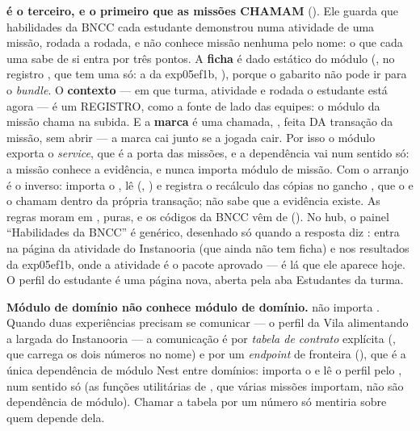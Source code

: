 \begin{regra}
\textbf{ é o terceiro, e o primeiro que as missões CHAMAM}
(). Ele guarda que habilidades da BNCC cada estudante demonstrou
numa atividade de uma missão, rodada a rodada, e não conhece missão nenhuma pelo
nome: o que cada uma sabe de si entra por três pontos. A \textbf{ficha} é dado
estático do módulo (, no registro
, que tem uma só: a da exp05ef1b, ), porque o gabarito
não pode ir para o \emph{bundle}. O \textbf{contexto} --- em que turma, atividade e rodada o
estudante está agora --- é um REGISTRO, como a fonte de lado das equipes: o módulo
da missão chama  na
subida. E a \textbf{marca} é uma chamada, , feita DA transação da missão, sem abrir  --- a marca cai
junto se a jogada cair. Por isso o módulo exporta o \emph{service}, que é a
porta das missões, e a dependência vai num sentido só: a missão conhece a
evidência, e  nunca importa módulo de missão. Com  o arranjo é o inverso:  importa
o , lê  (,
) e registra o recálculo das cópias no gancho
, que o  e o  chamam
dentro da própria transação;  não sabe que a evidência existe. As
regras moram em , puras, e os códigos da BNCC vêm de
 (). No hub, o painel
\enquote{Habilidades da BNCC} é genérico, desenhado só quando a resposta diz
: entra na página da atividade do Instanooria (que ainda não
tem ficha) e nos resultados da exp05ef1b, onde a atividade é o pacote aprovado
--- é lá que ele aparece hoje. O perfil do estudante é uma página nova, aberta
pela aba Estudantes da turma.

\textbf{Módulo de domínio não conhece módulo de domínio.}  não importa
. Quando duas experiências precisam se comunicar --- o perfil da
Vila alimentando a largada do Instanooria --- a comunicação é por \emph{tabela de
contrato} explícita (, que carrega os
dois números no nome) e por um \emph{endpoint} de fronteira
(), que é a única dependência de
módulo Nest entre domínios:  importa o  e lê o perfil
pelo , num sentido só (as funções utilitárias de
, que várias missões importam, não são dependência de módulo). Chamar a tabela por um número só mentiria sobre quem depende dela.
\end{regra}

